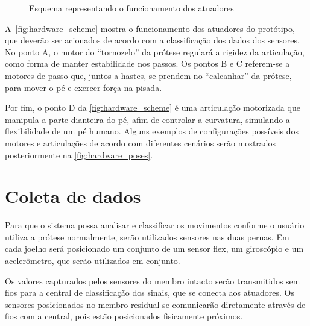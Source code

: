 \begin{figure}[ht]
	\caption{\label{fig:hardware_scheme}Esquema representando o funcionamento dos atuadores}
	\begin{center}
	\end{center}
\end{figure}

A~\autoref{fig:hardware_scheme} mostra o funcionamento dos atuadores do protótipo, que deverão ser acionados de acordo com a classificação dos dados dos sensores. No ponto A, o motor do ``tornozelo'' da prótese regulará a rigidez da articulação, como forma de manter estabilidade nos passos. Os pontos B e C referem-se a motores de passo que, juntos a hastes, se prendem no ``calcanhar'' da prótese, para mover o pé e exercer força na pisada.

Por fim, o ponto D da \autoref{fig:hardware_scheme} é uma articulação motorizada que manipula a parte dianteira do pé, afim de controlar a curvatura, simulando a flexibilidade de um pé humano. Alguns exemplos de configurações possíveis dos motores e articulações de acordo com diferentes cenários serão mostrados posteriormente na \autoref{fig:hardware_poses}.

\section{Coleta de dados}\label{sec:metodo_coleta}

Para que o sistema possa analisar e classificar os movimentos conforme o usuário utiliza a prótese normalmente, serão utilizados sensores nas duas pernas. Em cada joelho será posicionado um conjunto de um sensor flex, um giroscópio e um acelerômetro, que serão utilizados em conjunto.

Os valores capturados pelos sensores do membro intacto serão transmitidos sem fios para a central de classificação dos sinais, que se conecta aos atuadores. Os sensores posicionados no membro residual se comunicarão diretamente através de fios com a central, pois estão posicionados fisicamente próximos.

